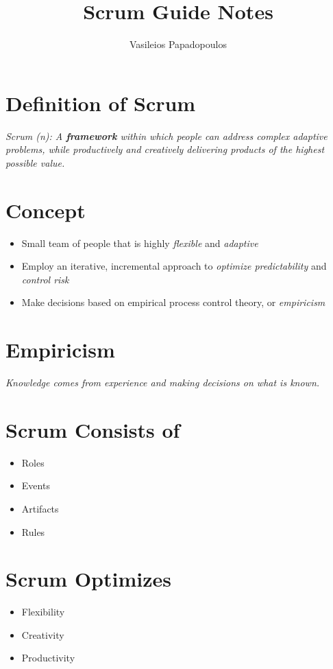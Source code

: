 \documentclass[a4paper,11pt,twocolumn]{article}
\title{\textbf{Scrum Guide Notes} \vspace{-1ex}}
\author{Vasileios Papadopoulos}
\date{}
\begin{document}
\maketitle

\thispagestyle{fancy}

\section*{Definition of Scrum}
\textit{Scrum (n): A \textbf{framework} within which people can address complex adaptive problems, while productively and creatively delivering products of the highest possible value.}

\section*{Concept}
\begin{itemize}
	\item Small team of people that is highly \textit{flexible} and \textit{adaptive}
	\item Employ an iterative, incremental approach to \textit{optimize predictability} and \textit{control risk}
	\item Make decisions based on empirical process control theory, or \textit{empiricism}
\end{itemize}

\section*{Empiricism}
\textit{Knowledge comes from experience and making decisions on what is known.}

\section*{Scrum Consists of}
\begin{itemize}
	\item Roles
	\item Events
	\item Artifacts
	\item Rules
\end{itemize}

\section*{Scrum Optimizes}
\begin{itemize}
	\item Flexibility
	\item Creativity
	\item Productivity
\end{itemize}
\end{document}
